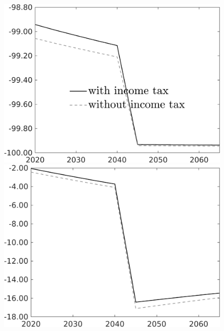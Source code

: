 \begin{figure}[h!!!]
\begin{minipage}[]{0.32\textwidth}
		\includegraphics[width=1\textwidth]{../../codding_model/own_basedOnFried/optimalPol_010922_revision/figures/all_13Sept22_Tplus30/gAf_PercentageLFDynNT_noeff_Target_regime0_spillover0_knspil1_noskill0_sep0_xgrowth0_PV1_etaa0.79_lgd1.png}
	\end{minipage}
	\begin{minipage}[]{0.32\textwidth}
		\includegraphics[width=1\textwidth]{../../codding_model/own_basedOnFried/optimalPol_010922_revision/figures/all_13Sept22_Tplus30/gAn_PercentageLFDynNT_noeff_Target_regime0_spillover0_knspil1_noskill0_sep0_xgrowth0_PV1_etaa0.79_lgd0.png}

\end{minipage}
\end{figure}

